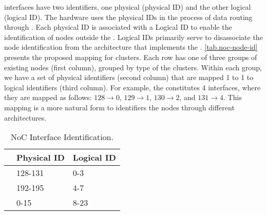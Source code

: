 
			\noc interfaces have two identifiers, one physical (physical ID) and the other logical (logical ID). The hardware uses the physical IDs in the process of data routing through \noc. Each physical ID is associated with a Logical ID to enable the identification of \noc nodes outside the \hal. Logical IDs primarily serve to disassociate the node identification from the architecture that implements the \hal. \autoref{tab.noc-node-id} presents the proposed mapping for \mppa clusters. Each row has one of three groups of existing \noc nodes (first column), grouped by type of the clusters. Within each group, we have a set of physical identifiers (second column) that are mapped 1 to 1 to logical identifiers (third column). For example, the  constitutes 4 \noc interfaces, where they are mapped as follows: $128 \to 0$, $129 \to 1$, $130 \to 2$, and $131 \to 4$. This mapping is a more natural form to identifiers the \noc nodes through different architectures.

			\begin{table}[!tb]
				\centering%
				\caption{NoC Interface Identification.}%
				\label{tab.noc-node-id}%

				\begin{tabular}{l|l|l|}
					\cline{2-3}
															   & \textbf{Physical ID} & \textbf{Logical ID} \\ \hline
					\multicolumn{1}{|l|}{\textbf{\iocluster0}} & 128-131              & 0-3                 \\ \hline
					\multicolumn{1}{|l|}{\textbf{\iocluster1}} & 192-195              & 4-7                 \\ \hline
					\multicolumn{1}{|l|}{\textbf{\cclusters}}  & 0-15                 & 8-23                \\ \hline
				\end{tabular}

			\end{table}

